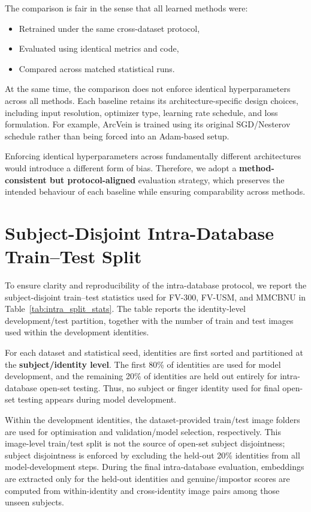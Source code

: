 \documentclass[10pt,journal,compsoc]{IEEEtran}
\begin{document}
The comparison is fair in the sense that all learned methods were:
\begin{itemize}
    \item Retrained under the same cross-dataset protocol,
    \item Evaluated using identical metrics and code,
    \item Compared across matched statistical runs.
\end{itemize}

At the same time, the comparison does not enforce identical hyperparameters across all methods. Each baseline retains its architecture-specific design choices, including input resolution, optimizer type, learning rate schedule, and loss formulation. For example, ArcVein is trained using its original SGD/Nesterov schedule rather than being forced into an Adam-based setup.

Enforcing identical hyperparameters across fundamentally different architectures would introduce a different form of bias. Therefore, we adopt a \textbf{method-consistent but protocol-aligned} evaluation strategy, which preserves the intended behaviour of each baseline while ensuring comparability across methods.

\section{Subject-Disjoint Intra-Database Train--Test Split}
\label{sec:supp_intra_split}
To ensure clarity and reproducibility of the intra-database protocol, we report the subject-disjoint train--test statistics used for FV-300, FV-USM, and MMCBNU in Table~\ref{tab:intra_split_stats}. The table reports the identity-level development/test partition, together with the number of train and test images used within the development identities.

For each dataset and statistical seed, identities are first sorted and partitioned at the \textbf{subject/identity level}. The first 80\% of identities are used for model development, and the remaining 20\% of identities are held out entirely for intra-database open-set testing. Thus, no subject or finger identity used for final open-set testing appears during model development.

Within the development identities, the dataset-provided train/test image folders are used for optimisation and validation/model selection, respectively. This image-level train/test split is not the source of open-set subject disjointness; subject disjointness is enforced by excluding the held-out 20\% identities from all model-development steps. During the final intra-database evaluation, embeddings are extracted only for the held-out identities and genuine/impostor scores are computed from within-identity and cross-identity image pairs among those unseen subjects.
\end{document}
